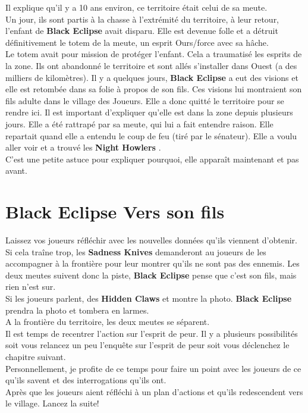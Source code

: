 \documentclass[oneside,12pt]{book}
\newcommand{\BlackEclipse}{\textbf{Black Eclipse} }
\newcommand{\Night}{\textbf{Night Howlers} }
\newcommand{\Sadness}{\textbf{Sadness Knives} }
\newcommand{\Hidden}{\textbf{Hidden Claws} }
\begin{document}
\begin{flushleft}
Il explique qu'il y a 10 ans environ, ce territoire était celui de sa meute.\\
Un jour, ils sont partis à la chasse à l'extrémité du territoire, à leur retour, l'enfant de \BlackEclipse avait disparu. Elle est devenue folle et a détruit définitivement le totem de la meute, un esprit Ours/force avec sa hâche. \\
Le totem avait pour mission de protéger l'enfant. Cela a traumatisé les esprits de la zone. Ils ont abandonné le territoire et sont allés s'installer dans Ouest (a des milliers de kilomètres). Il y a quelques jours, \BlackEclipse a eut des visions et elle est retombée dans sa folie à propos de son fils. Ces visions lui montraient son fils adulte dans le village des Joueurs. Elle a donc quitté le territoire pour se rendre ici. Il est important d'expliquer qu'elle est dans la zone depuis plusieurs jours. Elle a été rattrapé par sa meute, qui lui a fait entendre raison. Elle repartait quand elle a entendu le coup de feu (tiré par le sénateur). 
Elle a voulu aller voir et a trouvé les \Night. \\
C'est une petite astuce pour expliquer pourquoi, elle apparaît maintenant et pas avant.\\

\section{Black Eclipse Vers son fils}
Laissez vos joueurs réfléchir avec les nouvelles données qu'ils viennent d'obtenir. 
Si cela traîne trop, les \Sadness demanderont au joueurs de les accompagner à la frontière pour leur montrer qu'ils ne sont pas des ennemis. Les deux meutes suivent donc la piste, \BlackEclipse pense que c'est son fils, mais rien n'est sur.\\ 
Si les joueurs parlent, des \Hidden et montre la photo. \BlackEclipse prendra la photo et tombera en larmes. \\
A la frontière du territoire,  les deux meutes se séparent.\\
Il est temps de recentrer l'action sur l'esprit de peur. Il y a plusieurs possibilités soit vous relancez un peu l'enquête sur l'esprit de peur soit vous déclenchez le chapitre suivant. \\
Personnellement, je profite de ce temps pour faire un point avec les joueurs de ce qu'ils savent et des interrogations qu'ils ont. \\


Après que les joueurs aient réfléchi à un plan d'actions et qu'ils redescendent vers le village. Lancez la suite!



\end{flushleft}
\end{document}
